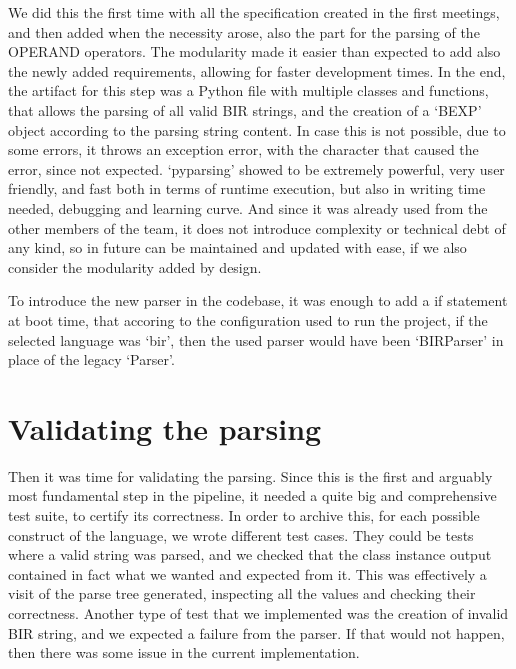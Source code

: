 We did this the first time with all the specification created in the first meetings,
and then added when the necessity arose, also the part for the parsing of the OPERAND
operators. The modularity made it easier than expected to add also the newly
added requirements, allowing for faster development times. In the end, the artifact
for this step was a Python file with multiple classes and functions, that allows
the parsing of all valid BIR strings, and the creation of a `BEXP' object according
to the parsing string content. In case this is not possible, due to some errors,
it throws an exception error, with the character that caused the error, since
not expected. `pyparsing' showed to be extremely powerful, very user friendly, and
fast both in terms of runtime execution, but also in writing time needed, debugging
and learning curve. And since it was already used from the other members of the
team, it does not introduce complexity or technical debt of any kind, so in
future can be maintained and updated with ease, if we also consider the modularity
added by design.

To introduce the new parser in the codebase, it was enough to add a if statement
at boot time, that accoring to the configuration used to run the project, if the
selected language was `bir', then the used parser would have been `BIRParser' in
place of the legacy `Parser'.

\section{Validating the parsing}
\label{cha:Validating the parsing} Then it was time for validating the parsing.
Since this is the first and arguably most fundamental step in the pipeline, it needed
a quite big and comprehensive test suite, to certify its correctness. In order to
archive this, for each possible construct of the language, we wrote different test
cases. They could be tests where a valid string was parsed, and we checked that the
class instance output contained in fact what we wanted and expected from it.
This was effectively a visit of the parse tree generated, inspecting all the values
and checking their correctness. Another type of test that we implemented was the
creation of invalid BIR string, and we expected a failure from the parser. If
that would not happen, then there was some issue in the current implementation.

